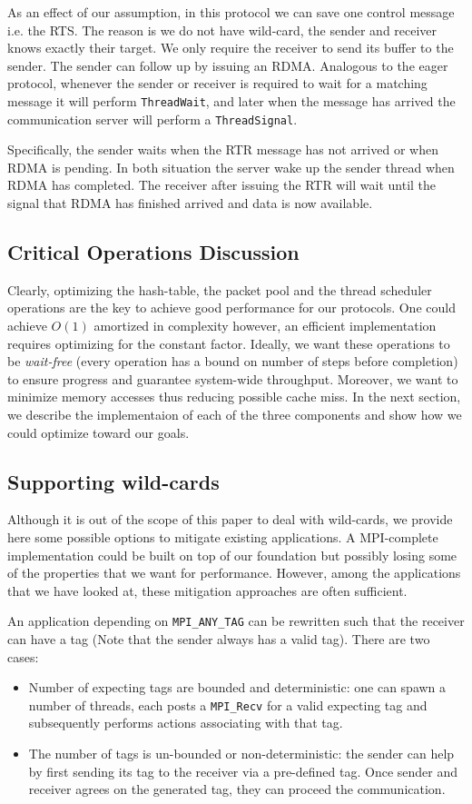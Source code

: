 As an effect of our assumption, in this protocol we can save one control
message i.e. the RTS.  The reason is we do not have wild-card, the sender and
receiver knows exactly their target.  We only require the receiver to send its
buffer to the sender. The sender can follow up by issuing an RDMA.  Analogous
to the eager protocol, whenever the sender or receiver is required to wait for
a matching message it will perform \texttt{ThreadWait}, and later when the
message has arrived the communication server will perform a
\texttt{ThreadSignal}.

Specifically, the sender waits when the RTR message has not arrived or when
RDMA is pending. In both situation the server wake up the sender thread when
RDMA has completed. The receiver after issuing the RTR will wait until the
signal that RDMA has finished arrived and data is now available.

\subsection{Critical Operations Discussion}
Clearly, optimizing the hash-table, the packet pool and the thread scheduler
operations are the key to achieve good performance for our protocols. One could
achieve $O(1)$ amortized in complexity however, an efficient implementation
requires optimizing for the constant factor. Ideally, we want these operations
to be \textit{wait-free} (every operation has a bound on number of steps before
completion) to ensure progress and guarantee system-wide throughput. Moreover, we 
want to minimize memory accesses thus reducing possible cache miss. In the next
section, we describe the implementaion of each of the three components and show
how we could optimize toward our goals.

\subsection{Supporting wild-cards}
Although it is out of the scope of this paper to deal with wild-cards, we
provide here some possible options to mitigate existing applications. A
MPI-complete implementation could be built on top of our foundation but
possibly losing some of the properties that we want for performance. However,
among the applications that we have looked at, these mitigation approaches are
often sufficient.

An application depending on \texttt{MPI_ANY_TAG} can be rewritten such
that the receiver can have a tag (Note that the sender always has a valid tag).
There are two cases:
\begin{itemize}
  \item Number of expecting tags are bounded and deterministic: one can spawn a
    number of threads, each posts a \texttt{MPI_Recv} for a valid expecting
    tag and subsequently performs actions associating with that tag. 
  \item The number of tags is un-bounded or non-deterministic: the sender
    can help by first sending its tag to the receiver via a pre-defined tag.
    Once sender and receiver agrees on the generated tag, they can proceed
    the communication.
\end{itemize}

